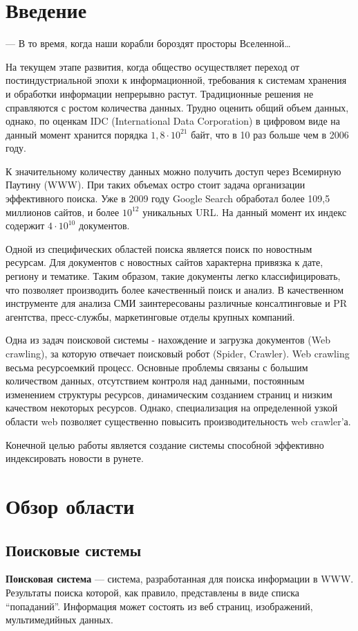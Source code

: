 \chapter*{Введение}
\epigraph{— В то время, когда наши корабли бороздят просторы
Вселенной…}{} На текущем этапе развития, когда общество осуществляет переход от
постиндустриальной эпохи к информационной, требования к системам хранения и
обработки информации непрерывно растут. Традиционные решения не справляются с
ростом количества данных. Трудно оценить общий объем данных, однако, по оценкам
IDC (International Data Corporation) в цифровом виде на данный момент хранится порядка
$1,8\cdot10^{21}$ байт, что в 10 раз больше чем в 2006 году.

К значительному количеству данных можно получить доступ через Всемирную Паутину
(WWW). При таких объемах остро стоит задача организации эффективного поиска. Уже
в 2009 году Google Search обработал более 109,5 миллионов сайтов, и более
$10^{12}$ уникальных URL. На данный момент их индекс содержит $4\cdot10^{10}$ документов.

Одной из специфических областей поиска является поиск по новостным ресурсам.
 Для документов с новостных сайтов характерна привязка к дате, региону и тематике.
 Таким образом, такие документы легко классифицировать, что позволяет производить более качественный поиск и анализ.
 В качественном инструменте для анализа СМИ заинтересованы различные консалтинговые и PR агентства, пресс-службы, маркетинговые отделы крупных компаний.

Одна из задач поисковой системы - нахождение и загрузка документов (Web crawling), за которую отвечает поисковый робот (Spider, Crawler).
 Web crawling весьма ресурсоемкий процесс. Основные проблемы связаны с большим количеством данных,
 отсутствием  контроля над данными, постоянным изменением структуры ресурсов, динамическим созданием страниц и низким качеством некоторых ресурсов.
 Однако, специализация на определенной узкой области web позволяет существенно повысить производительность web crawler'а.

Конечной целью работы является создание системы способной эффективно индексировать новости в рунете.

\chapter{Обзор области}
\section{Поисковые системы}
\textbf{Поисковая система} --- система, разработанная для
поиска информации в WWW. Результаты поиска которой, как правило, представлены в
виде списка ``попаданий''. Информация может состоять из веб страниц,  изображений,
мультимедийных данных. 

